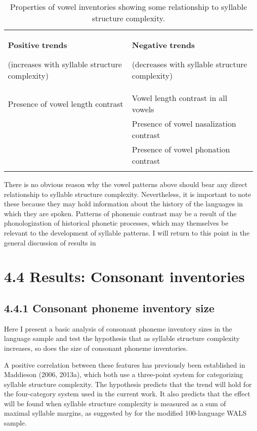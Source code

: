 \begin{table}
\begin{tabularx}{\textwidth}{XX}
\lsptoprule

\textbf{Positive} \textbf{trends}

(increases with syllable structure complexity) & \textbf{Negative} \textbf{trends}

(decreases with syllable structure complexity)\\
Presence of vowel length contrast & Vowel length contrast in all vowels\\
& Presence of vowel nasalization contrast\\
& Presence of vowel phonation contrast\\
\lspbottomrule
\end{tabularx}
\caption{\label{4.8}Properties of vowel inventories showing some relationship to syllable structure complexity.}
\end{table}




  There is no obvious reason why the vowel patterns above should bear any direct relationship to syllable structure complexity. Nevertheless, it is important to note these because they may hold information about the history of the languages in which they are spoken. Patterns of phonemic contrast may be a result of the phonologization of historical phonetic processes, which may themselves be relevant to the development of syllable patterns. I will return to this point in the general discussion of results in 


\section{4.4 Results: Consonant inventories}
\subsection{4.4.1 Consonant phoneme inventory size}

  Here I present a basic analysis of consonant phoneme inventory sizes in the language sample and test the hypothesis that as syllable structure complexity increases, so does the size of consonant phoneme inventories.



  A positive correlation between these features has previously been established in Maddieson (2006, 2013a), which both use a three-point system for categorizing syllable structure complexity. The hypothesis predicts that the trend will hold for the four-category system used in the current work. It also predicts that the effect will be found when syllable structure complexity is measured as a sum of maximal syllable margins, as suggested by \citet{Gordon2016} for the modified 100-language WALS sample.



